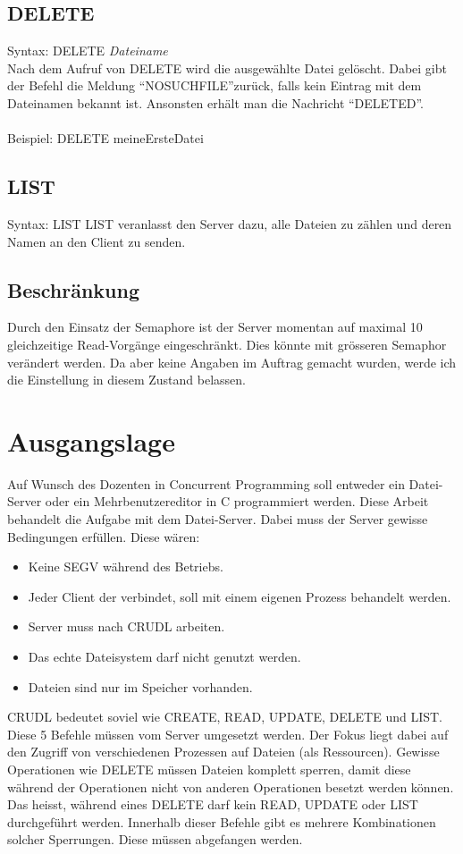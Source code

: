\documentclass[12pt,a4paper,ngerman]{report}
\begin{document}
\section{DELETE}
Syntax: DELETE \textit{Dateiname}\\
Nach dem Aufruf von DELETE wird die ausgewählte Datei gelöscht. Dabei gibt der Befehl die Meldung \textquotedblleft NOSUCHFILE\textquotedblright zurück, falls kein Eintrag mit dem Dateinamen bekannt ist. Ansonsten erhält man die Nachricht \textquotedblleft DELETED\textquotedblright . \\
\\
Beispiel: DELETE meineErsteDatei
\section{LIST}
Syntax: LIST
LIST veranlasst den Server dazu, alle Dateien zu zählen und deren Namen an den Client zu senden.
\section{Beschränkung}
Durch den Einsatz der Semaphore ist der Server momentan auf maximal 10 gleichzeitige Read-Vorgänge eingeschränkt. Dies könnte mit grösseren Semaphor verändert werden. Da aber keine Angaben im Auftrag gemacht wurden, werde ich die Einstellung in diesem Zustand belassen.
\chapter{Ausgangslage}
Auf Wunsch des Dozenten in Concurrent Programming soll entweder ein Datei-Server oder ein Mehrbenutzereditor in C programmiert werden. Diese Arbeit behandelt die Aufgabe mit dem Datei-Server. Dabei muss der Server gewisse Bedingungen erfüllen. Diese wären:
\begin{itemize}
	\item Keine SEGV während des Betriebs.
	\item Jeder Client der verbindet, soll mit einem eigenen Prozess behandelt werden.
	\item Server muss nach CRUDL arbeiten.
	\item Das echte Dateisystem darf nicht genutzt werden.
	\item Dateien sind nur im Speicher vorhanden.
\end{itemize}

CRUDL bedeutet soviel wie CREATE, READ, UPDATE, DELETE und LIST. Diese 5 Befehle müssen vom Server umgesetzt werden. Der Fokus liegt dabei auf den Zugriff von verschiedenen Prozessen auf Dateien (als Ressourcen). Gewisse Operationen wie DELETE müssen Dateien komplett sperren, damit diese während der Operationen nicht von anderen Operationen besetzt werden können. Das heisst, während eines DELETE darf kein READ, UPDATE oder LIST durchgeführt werden. Innerhalb dieser Befehle gibt es mehrere Kombinationen solcher Sperrungen. Diese müssen abgefangen werden.
\end{document}
